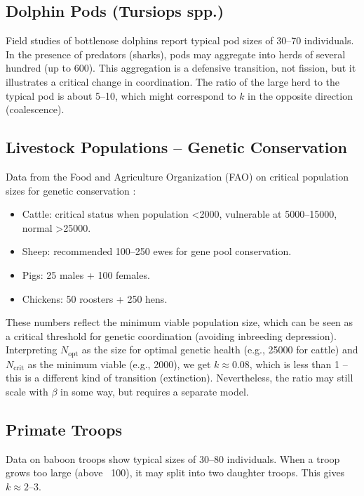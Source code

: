 \documentclass[12pt]{article}
\theoremstyle{remark}
\begin{document}
	\subsection{Dolphin Pods (Tursiops spp.)}
	\label{subsec:dolphins}
	
	Field studies of bottlenose dolphins \cite{Connor2000} report typical pod sizes of 30–70 individuals. In the presence of predators (sharks), pods may aggregate into herds of several hundred (up to 600). This aggregation is a defensive transition, not fission, but it illustrates a critical change in coordination. The ratio of the large herd to the typical pod is about 5–10, which might correspond to $k$ in the opposite direction (coalescence).
	
	\subsection{Livestock Populations – Genetic Conservation}
	\label{subsec:livestock}
	
	Data from the Food and Agriculture Organization (FAO) on critical population sizes for genetic conservation \cite{FAO2013}:
	\begin{itemize}
		\item Cattle: critical status when population <2000, vulnerable at 5000–15000, normal >25000.
		\item Sheep: recommended 100–250 ewes for gene pool conservation.
		\item Pigs: 25 males + 100 females.
		\item Chickens: 50 roosters + 250 hens.
	\end{itemize}
	These numbers reflect the minimum viable population size, which can be seen as a critical threshold for genetic coordination (avoiding inbreeding depression). Interpreting $N_{\text{opt}}$ as the size for optimal genetic health (e.g., 25000 for cattle) and $N_{\text{crit}}$ as the minimum viable (e.g., 2000), we get $k \approx 0.08$, which is less than 1 – this is a different kind of transition (extinction). Nevertheless, the ratio may still scale with $\beta$ in some way, but requires a separate model.
	
	\subsection{Primate Troops}
	\label{subsec:primates}
	
	Data on baboon troops \cite{Alberts1995} show typical sizes of 30–80 individuals. When a troop grows too large (above ~100), it may split into two daughter troops. This gives $k \approx 2$–$3$.
	
\end{document}
